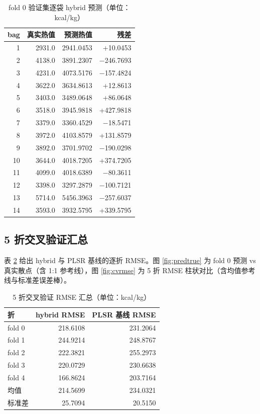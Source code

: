 \documentclass[11pt,a4paper]{ctexart}
\begin{document}
\begin{table}[htbp]
\centering
\caption{fold 0 验证集逐袋 hybrid 预测（单位：kcal/kg）\label{tab:fold0}}
\footnotesize
\begin{tabular}{rrrr}
\toprule
bag & 真实热值 & 预测热值 & 残差 \\
\midrule
1  & 2931.0 & 2941.0453 &   +10.0453 \\
2  & 4138.0 & 3891.2307 &  $-$246.7693 \\
3  & 4231.0 & 4073.5176 &  $-$157.4824 \\
4  & 3622.0 & 3634.8613 &   +12.8613 \\
5  & 3403.0 & 3489.0648 &   +86.0648 \\
6  & 3518.0 & 3945.9818 &  +427.9818 \\
7  & 3379.0 & 3360.4529 &  $-$18.5471 \\
8  & 3972.0 & 4103.8579 &  +131.8579 \\
9  & 3892.0 & 3701.9702 &  $-$190.0298 \\
10 & 3644.0 & 4018.7205 &  +374.7205 \\
11 & 4099.0 & 4018.6389 &  $-$80.3611 \\
12 & 3398.0 & 3297.2879 &  $-$100.7121 \\
13 & 5714.0 & 5456.3963 &  $-$257.6037 \\
14 & 3593.0 & 3932.5795 &  +339.5795 \\
\bottomrule
\end{tabular}
\end{table}

\subsection{5 折交叉验证汇总}
表 \ref{tab:cv} 给出 hybrid 与 PLSR 基线的逐折 RMSE。图 \ref{fig:predtrue} 为 fold 0 预测 vs 真实散点（含 1:1 参考线），图 \ref{fig:cvrmse} 为 5 折 RMSE 柱状对比（含均值参考线与标准差误差棒）。

\begin{table}[htbp]
\centering
\caption{5 折交叉验证 RMSE 汇总（单位：kcal/kg）\label{tab:cv}}
\begin{tabular}{lrr}
\toprule
折 & hybrid RMSE & PLSR 基线 RMSE \\
\midrule
fold 0 & 218.6108 & 231.2064 \\
fold 1 & 244.9214 & 248.8767 \\
fold 2 & 222.3821 & 255.2973 \\
fold 3 & 220.0729 & 230.6638 \\
fold 4 & 166.8624 & 203.7164 \\
\midrule
均值 & 214.5699 & 234.0321 \\
标准差 & 25.7094 & 20.5150 \\
\bottomrule
\end{tabular}
\end{table}
\end{document}
